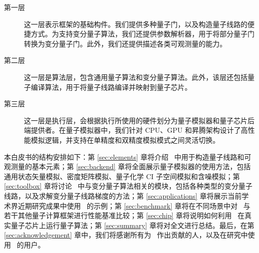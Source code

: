 \begin{description}
    \item[第一层] 这一层表示框架的基础构件。我们提供多种量子门，以及构造量子线路的便捷方式。为支持变分量子算法，我们还提供参数解析器，用于将部分量子门转换为变分量子门。此外，我们还提供描述各类可观测量的能力。
    \item[第二层] 这一层是算法层，包含通用量子算法和变分量子算法。此外，该层还包括量子编译算法，用于将量子线路编译并映射到量子芯片。
    \item[第三层] 这一层是执行层，会根据执行所使用的硬件划分为量子模拟器和量子芯片后端提供者。在量子模拟器中，我们针对 CPU、GPU 和昇腾架构设计了高性能模拟逻辑，并支持在单精度和双精度模拟模式之间灵活切换。
\end{description}

本白皮书的结构安排如下：第 \hyperref[sec:elements]{\ref*{sec:elements}} 章将介绍 \MindQuantum\ 中用于构造量子线路和可观测量的基本元素；第 \hyperref[sec:backend]{\ref*{sec:backend}} 章将全面展示量子模拟器的使用方法，包括通用状态矢量模拟、密度矩阵模拟、量子化学 CI 子空间模拟和含噪模拟；第 \hyperref[sec:toolbox]{\ref*{sec:toolbox}} 章将讨论 \MindQuantum\ 中与变分量子算法相关的模块，包括各种类型的变分量子线路，以及求解变分量子线路梯度的方法；第 \hyperref[sec:applications]{\ref*{sec:applications}} 章将展示当前学术界近期研究成果中使用 \MindQuantum\ 的示例；第 \hyperref[sec:benchmark]{\ref*{sec:benchmark}} 章将在不同场景中对 \MindQuantum\ 与若干其他量子计算框架进行性能基准比较；第 \hyperref[sec:chip]{\ref*{sec:chip}} 章将说明如何利用 \MindQuantum\ 在真实量子芯片上运行量子算法；第 \hyperref[sec:summary]{\ref*{sec:summary}} 章将对全文进行总结。最后，在第 \hyperref[sec:acknowledgement]{\ref*{sec:acknowledgement}} 章中，我们将感谢所有为 \MindQuantum\ 作出贡献的人，以及在研究中使用 \MindQuantum\ 的用户。
